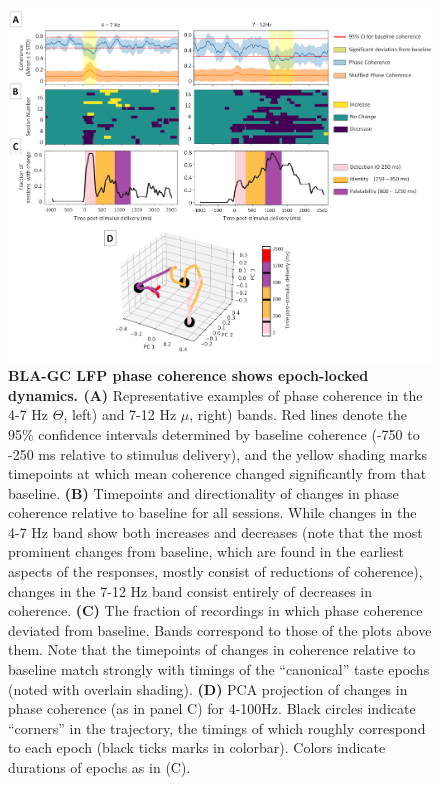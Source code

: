 \begin{refsection}
\begin{figure}
\includegraphics[width=\linewidth]{mahmood_22_figures/fig8-0.png}
\caption{\textbf{BLA-GC LFP phase coherence shows epoch-locked dynamics. (A)} Representative examples of phase coherence in the 4-7 Hz \(\Theta\), left) and 7-12 Hz \(\mu\), right) bands. Red lines denote the 95\% confidence intervals determined by baseline coherence (-750 to -250 ms relative to stimulus delivery), and the yellow shading marks timepoints at which mean coherence changed significantly from that baseline. \textbf{(B)} Timepoints and directionality of changes in phase coherence relative to baseline for all sessions. While changes in the 4-7 Hz band show both increases and decreases (note that the most prominent changes from baseline, which are found in the earliest aspects of the responses, mostly consist of reductions of coherence), changes in the 7-12 Hz band consist entirely of decreases in coherence. \textbf{(C)} The fraction of recordings in which phase coherence deviated from baseline. Bands correspond to those of the plots above them. Note that the timepoints of changes in coherence relative to baseline match strongly with timings of the “canonical” taste epochs (noted with overlain shading). \textbf{(D)} PCA projection of changes in phase coherence (as in panel C) for 4-100Hz. Black circles indicate “corners” in the trajectory, the timings of which roughly correspond to each epoch (black ticks marks in colorbar). Colors indicate durations of epochs as in (C).}
\label{fig:wrapfig}
\end{figure}


\end{refsection}
